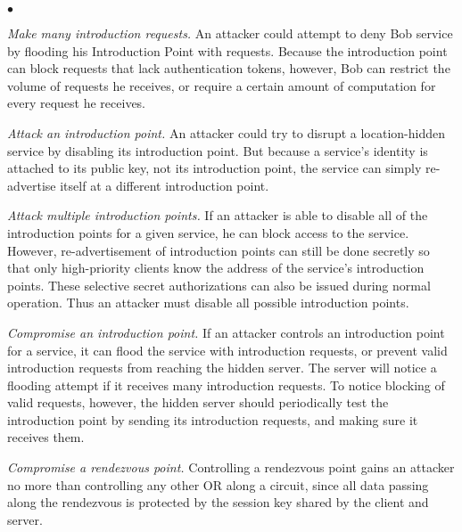 \documentclass[times,10pt,twocolumn]{article}
\newenvironment{tightlist}{\begin{list}{$\bullet$}{
  \setlength{\itemsep}{0mm}
    \setlength{\parsep}{0mm}
    }}{\end{list}}
\begin{document}
\begin{tightlist}
\item \emph{Make many introduction requests.}  An attacker could
  attempt to deny Bob service by flooding his Introduction Point with
  requests.  Because the introduction point can block requests that
  lack authentication tokens, however, Bob can restrict the volume of
  requests he receives, or require a certain amount of computation for
  every request he receives.
  
\item \emph{Attack an introduction point.} An attacker could try to
  disrupt a location-hidden service by disabling its introduction
  point.  But because a service's identity is attached to its public
  key, not its introduction point, the service can simply re-advertise
  itself at a different introduction point.
  
\item \emph{Attack multiple introduction points.}  If an attacker is
  able to disable all of the introduction points for a given service,
  he can block access to the service. However, re-advertisement of
  introduction points can still be done secretly so that only
  high-priority clients know the address of the service's introduction
  points. These selective secret authorizations can also be issued
  during normal operation. Thus an attacker must disable
  all possible introduction points.

\item \emph{Compromise an introduction point.} If an attacker controls
  an introduction point for a service, it can flood the service with
  introduction requests, or prevent valid introduction requests from
  reaching the hidden server.  The server will notice a flooding
  attempt if it receives many introduction requests.  To notice
  blocking of valid requests, however, the hidden server should
  periodically test the introduction point by sending its introduction
  requests, and making sure it receives them.

\item \emph{Compromise a rendezvous point.}  Controlling a rendezvous
  point gains an attacker no more than controlling any other OR along
  a circuit, since all data passing along the rendezvous is protected
  by the session key shared by the client and server.

\end{tightlist}

\label{sec:maintaining-anonymity}
 
\end{document}
